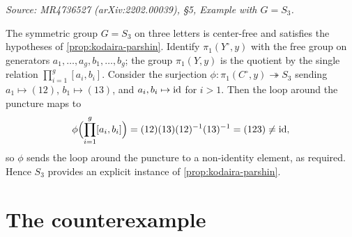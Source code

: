 \begin{definition}
  \label{ex:kodaira-parshin-S3}
  \textit{Source: MR4736527 (arXiv:2202.00039), §5, Example with \(G = S_3\).}

  The symmetric group \(G = S_3\) on three letters is center-free and satisfies
  the hypotheses of \cref{prop:kodaira-parshin}. Identify
  \(\pi_1(Y^\circ, y)\) with the free group on generators
  \(a_1, \ldots, a_g, b_1, \ldots, b_g\); the group \(\pi_1(Y, y)\) is the
  quotient by the single relation \(\prod_{i=1}^g [a_i, b_i]\). Consider the
  surjection \(\phi : \pi_1(C^\circ, y) \twoheadrightarrow S_3\) sending
  \(a_1 \mapsto (12)\), \(b_1 \mapsto (13)\), and \(a_i, b_i \mapsto \operatorname{id}\) for
  \(i > 1\). Then the loop around the puncture maps to
  \[
    \phi\Bigl(\prod_{i=1}^g [a_i, b_i]\Bigr) = (12)(13)(12)^{-1}(13)^{-1}
    = (123) \neq \operatorname{id},
  \]
  so \(\phi\) sends the loop around the puncture to a non-identity element, as
  required. Hence \(S_3\) provides an explicit instance of
  \cref{prop:kodaira-parshin}.
\end{definition}

\section{The counterexample}

